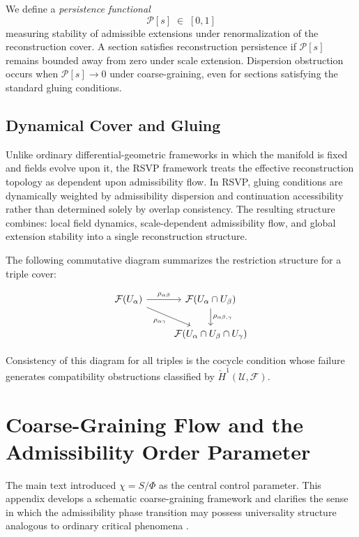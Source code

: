 \documentclass[11pt, a4paper]{article}
\theoremstyle{plain}
\theoremstyle{definition}
\theoremstyle{remark}
\newcommand{\sheaf}{\mathcal{F}}
\newcommand{\Ucover}{\mathcal{U}}
\newcommand{\Hcech}{\check{H}}
\begin{document}
We define a \emph{persistence functional}
\[
  \mathcal{P}[s] \;\in\; [0,1]
\]
measuring stability of admissible extensions under renormalization of the
reconstruction cover. A section satisfies reconstruction persistence if
$\mathcal{P}[s]$ remains bounded away from zero under scale extension. Dispersion
obstruction occurs when $\mathcal{P}[s] \to 0$ under coarse-graining, even for
sections satisfying the standard gluing conditions.

\subsection{Dynamical Cover and Gluing}

Unlike ordinary differential-geometric frameworks in which the manifold is fixed and
fields evolve upon it, the RSVP framework treats the effective reconstruction
topology as dependent upon admissibility flow. In RSVP, gluing conditions are
dynamically weighted by admissibility dispersion and continuation accessibility
rather than determined solely by overlap consistency. The resulting structure combines:
local field dynamics, scale-dependent admissibility flow, and global extension
stability into a single reconstruction structure.

The following commutative diagram summarizes the restriction structure for a triple
cover:

\[
\begin{tikzcd}
\sheaf(U_\alpha) \arrow[r, "\rho_{\alpha\beta}"] \arrow[dr, "\rho_{\alpha\gamma}"']
  & \sheaf(U_\alpha \cap U_\beta) \arrow[d, "\rho_{\alpha\beta,\gamma}"] \\
  & \sheaf(U_\alpha \cap U_\beta \cap U_\gamma)
\end{tikzcd}
\]

Consistency of this diagram for all triples is the cocycle condition whose failure
generates compatibility obstructions classified by $\Hcech^1(\Ucover, \sheaf)$.

\section{Coarse-Graining Flow and the Admissibility Order Parameter}
\label{app:flow}

The main text introduced $\chi = S/\Phi$ as the central control parameter. This
appendix develops a schematic coarse-graining framework and clarifies the sense in
which the admissibility phase transition may possess universality structure analogous
to ordinary critical phenomena \cite{wilson1974,goldenfeld1992}.
\end{document}

